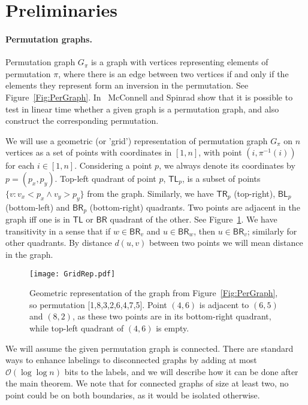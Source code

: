 \documentclass[a4paper,11pt]{article}
\newcommand{\Oh}{\mathcal{O}}
\newcommand{\BR}{\mathsf{BR}}
\newcommand{\BL}{\mathsf{BL}}
\newcommand{\TR}{\mathsf{TR}}
\newcommand{\TL}{\mathsf{TL}}
\begin{document}
\section{Preliminaries}
\label{Sec:Prelim}

\paragraph{Permutation graphs.}
Permutation graph $G_{\pi}$ is a graph with vertices representing elements of permutation $\pi$,
where there is an edge between two vertices if and only if the elements they represent form an inversion in the permutation.
See Figure~\ref{Fig:PerGraph}.
In~\cite{McConnellS99} McConnell and Spinrad show that it is possible to test in linear time whether
a given graph is a permutation graph, and also construct the corresponding permutation.

We will use a geometric (or 'grid') representation of permutation graph $G_{\pi}$ on $n$ vertices as a set of points with coordinates in $[1,n]$,
with point $(i,\pi^{-1}(i))$ for each $i \in [1,n]$.
Considering a point $p$, we always denote its coordinates by $p=(p_x,p_y)$.
Top-left quadrant of point $p$, $\TL_p$, is a subset of points $\{v: v_x < p_x \land v_y > p_y\}$ from the graph.
Similarly, we have $\TR_p$ (top-right), $\BL_p$ (bottom-left) and $\BR_p$ (bottom-right) quadrants.
Two points are adjacent in the graph iff one is in $\TL$ or $\BR$ quadrant of the other.
See Figure~\ref{Fig:Grid}.
We have transitivity in a sense that if $w \in \BR_v$ and $u \in \BR_w$, then $u \in \BR_v$; similarly for other quadrants.
By distance $d(u,v)$ between two points we will mean distance in the graph.

\begin{figure}[h]
\begin{center}
  \texttt{[image: GridRep.pdf]}
\end{center}
\caption{Geometric representation of the graph from Figure~\ref{Fig:PerGraph}, so permutation [1,8,3,2,6,4,7,5].
Point $(4,6)$ is adjacent to $(6,5)$ and $(8,2)$, as these two points are in its bottom-right quadrant,
while top-left quadrant of $(4,6)$ is empty.}
\label{Fig:Grid}
\end{figure}

We will assume the given permutation graph is connected.
There are standard ways to enhance labelings to disconnected graphs by adding at most $\Oh(\log{\log{n}})$ bits to the labels,
and we will describe how it can be done after the main theorem.
We note that for connected graphs of size at least two, no point could be on both boundaries,
as it would be isolated otherwise.
\end{document}

